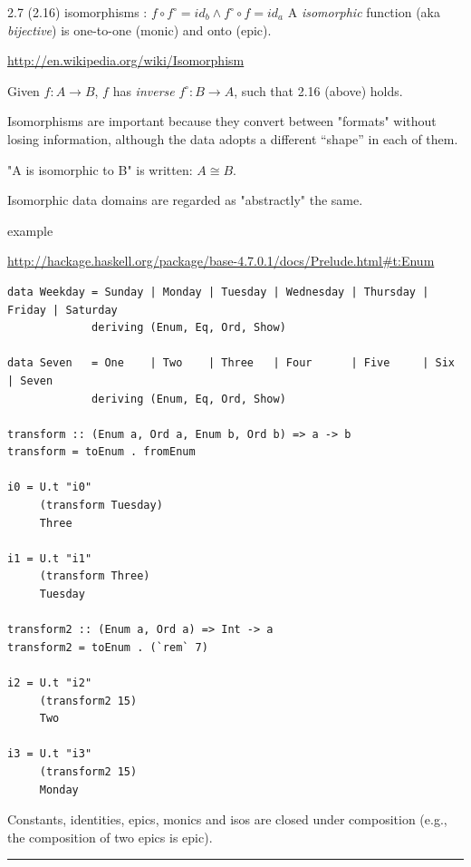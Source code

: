 \documentclass[presentation]{beamer}
\begin{document}
\begin{frame}[fragile,label=sec-6]{2.7 (2.16) isomorphisms : $f \circ f^{\circ} = id_b \wedge f^{\circ} \circ f = id_a$}
 A \emph{isomorphic} function (aka \emph{bijective}) is one-to-one (monic) and onto (epic).

\url{http://en.wikipedia.org/wiki/Isomorphism}

Given $f : A \rightarrow B$,
$f$ has \emph{inverse}
$f^{\circ} : B \rightarrow A$,
such that 2.16 (above) holds.

Isomorphisms are important because they convert between "formats"
without losing information, although the data adopts a different
“shape” in each of them.

"A is isomorphic to B" is written: $A \cong B$.

Isomorphic data domains are regarded as "abstractly" the same.

\alert{example}

\url{http://hackage.haskell.org/package/base-4.7.0.1/docs/Prelude.html#t:Enum}

\begin{verbatim}
data Weekday = Sunday | Monday | Tuesday | Wednesday | Thursday | Friday | Saturday
             deriving (Enum, Eq, Ord, Show)

data Seven   = One    | Two    | Three   | Four      | Five     | Six    | Seven
             deriving (Enum, Eq, Ord, Show)

transform :: (Enum a, Ord a, Enum b, Ord b) => a -> b
transform = toEnum . fromEnum

i0 = U.t "i0"
     (transform Tuesday)
     Three

i1 = U.t "i1"
     (transform Three)
     Tuesday

transform2 :: (Enum a, Ord a) => Int -> a
transform2 = toEnum . (`rem` 7)

i2 = U.t "i2"
     (transform2 15)
     Two

i3 = U.t "i3"
     (transform2 15)
     Monday
\end{verbatim}

Constants, identities, epics, monics and isos are \alert{closed under
composition} (e.g., the composition of two epics is epic).

\rule{\linewidth}{0.5pt}
\end{frame}
\end{document}
